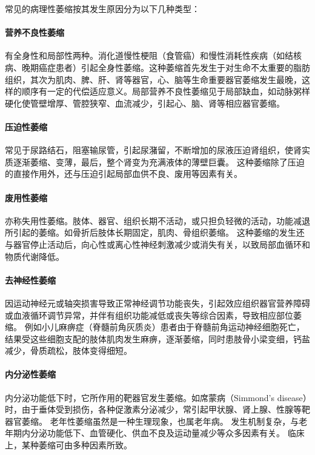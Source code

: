 常见的病理性萎缩按其发生原因分为以下几种类型：

\paragraph{营养不良性萎缩}
有全身性和局部性两种。消化道慢性梗阻（食管癌）和慢性消耗性疾病（如结核病、晚期癌症患者）引起全身性萎缩。这种萎缩首先发生于对生命不太重要的脂肪组织，其次为肌肉、脾、肝、肾等器官，心、脑等生命重要器官萎缩发生最晚，这样的顺序有一定的代偿适应意义。局部营养不良性萎缩见于局部缺血，如动脉粥样硬化使管壁增厚、管腔狭窄、血流减少，引起心、脑、肾等相应器官萎缩。

\paragraph{压迫性萎缩}
常见于尿路结石，阻塞输尿管，引起尿潴留，不断增加的尿液压迫肾组织，使肾实质逐渐萎缩、变薄，最后，整个肾变为充满液体的薄壁巨囊。
这种萎缩除了压迫的直接作用外，还与压迫引起局部血供不良、废用等因素有关。

\paragraph{废用性萎缩}
亦称失用性萎缩。肢体、器官、组织长期不活动，或只担负轻微的活动，功能减退所引起的萎缩。如骨折后肢体长期固定，肌肉、骨组织萎缩。
这种萎缩的发生还与器官停止活动后，向心性或离心性神经刺激减少或消失有关，以致局部血循环和物质代谢降低。

\paragraph{去神经性萎缩}
因运动神经元或轴突损害导致正常神经调节功能丧失，引起效应组织器官营养障碍或血液循环调节异常，并伴有组织功能减低或丧失等综合因素，导致相应部位萎缩。
例如小儿麻痹症（脊髓前角灰质炎）患者由于脊髓前角运动神经细胞死亡，结果受这些细胞支配的肢体肌肉发生麻痹，逐渐萎缩，同时患肢骨小梁变细，钙盐减少，骨质疏松，肢体变得细短。

\paragraph{内分泌性萎缩}
内分泌功能低下时，它所作用的靶器官发生萎缩。如席蒙病（Simmond's
disease）时，由于垂体受到损伤，各种促激素分泌减少，常引起甲状腺、肾上腺、性腺等靶器官萎缩。
老年性萎缩虽然是一种生理现象，也属老年病。
发生机制复杂，与老年期内分泌功能低下、血管硬化、供血不良及运动量减少等众多因素有关。
临床上，某种萎缩可由多种因素所致。

